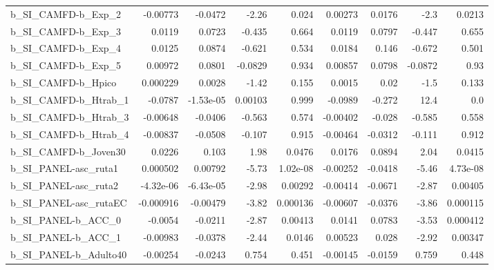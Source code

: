 \begin{tabular}{lrrrrrrrr}
b\_SI\_CAMFD-b\_Exp\_2         &    -0.00773 &      -0.0472 &    -2.26 &    0.024 &    0.00273 &      0.0176 &         -2.3 &        0.0213 \\
b\_SI\_CAMFD-b\_Exp\_3         &      0.0119 &       0.0723 &   -0.435 &    0.664 &     0.0119 &      0.0797 &       -0.447 &         0.655 \\
b\_SI\_CAMFD-b\_Exp\_4         &      0.0125 &       0.0874 &   -0.621 &    0.534 &     0.0184 &       0.146 &       -0.672 &         0.501 \\
b\_SI\_CAMFD-b\_Exp\_5         &     0.00972 &       0.0801 &  -0.0829 &    0.934 &    0.00857 &      0.0798 &      -0.0872 &          0.93 \\
b\_SI\_CAMFD-b\_Hpico         &    0.000229 &       0.0028 &    -1.42 &    0.155 &     0.0015 &        0.02 &         -1.5 &         0.133 \\
b\_SI\_CAMFD-b\_Htrab\_1       &     -0.0787 &    -1.53e-05 &  0.00103 &    0.999 &    -0.0989 &      -0.272 &         12.4 &           0.0 \\
b\_SI\_CAMFD-b\_Htrab\_3       &    -0.00648 &      -0.0406 &   -0.563 &    0.574 &   -0.00402 &      -0.028 &       -0.585 &         0.558 \\
b\_SI\_CAMFD-b\_Htrab\_4       &    -0.00837 &      -0.0508 &   -0.107 &    0.915 &   -0.00464 &     -0.0312 &       -0.111 &         0.912 \\
b\_SI\_CAMFD-b\_Joven30       &      0.0226 &        0.103 &     1.98 &   0.0476 &     0.0176 &      0.0894 &         2.04 &        0.0415 \\
b\_SI\_PANEL-asc\_ruta1       &    0.000502 &      0.00792 &    -5.73 & 1.02e-08 &   -0.00252 &     -0.0418 &        -5.46 &      4.73e-08 \\
b\_SI\_PANEL-asc\_ruta2       &   -4.32e-06 &    -6.43e-05 &    -2.98 &  0.00292 &   -0.00414 &     -0.0671 &        -2.87 &       0.00405 \\
b\_SI\_PANEL-asc\_rutaEC      &   -0.000916 &     -0.00479 &    -3.82 & 0.000136 &   -0.00607 &     -0.0376 &        -3.86 &      0.000115 \\
b\_SI\_PANEL-b\_ACC\_0         &     -0.0054 &      -0.0211 &    -2.87 &  0.00413 &     0.0141 &      0.0783 &        -3.53 &      0.000412 \\
b\_SI\_PANEL-b\_ACC\_1         &    -0.00983 &      -0.0378 &    -2.44 &   0.0146 &    0.00523 &       0.028 &        -2.92 &       0.00347 \\
b\_SI\_PANEL-b\_Adulto40      &    -0.00254 &      -0.0243 &    0.754 &    0.451 &   -0.00145 &     -0.0159 &        0.759 &         0.448 \\

\end{tabular}
